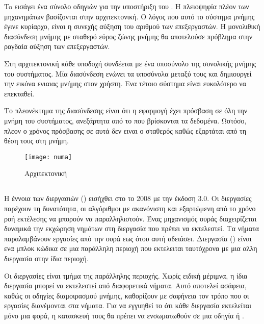 To \emph{} εισάγει ένα σύνολο οδηγιών για την υποστήριξη του \emph{}\cite{thread_affinity}. Η πλειοψηφία πλέον των μηχανημάτων βασίζονται στην \emph{} αρχιτεκτονική. Ο λόγος που αυτό το σύστημα μνήμης έγινε κυρίαρχο, είναι η συνεχής αύξηση του αριθμού των επεξεργαστών. Η μονολιθική διασύνδεση μνήμης με σταθερό εύρος ζώνης μνήμης θα αποτελούσε πρόβλημα στην ραγδαία αύξηση των επεξεργαστών.

Στη \emph{} αρχιτεκτονική κάθε υποδοχή συνδέεται με ένα υποσύνολο της συνολικής μνήμης του συστήματος. Μία διασύνδεση ενώνει τα υποσύνολα μεταξύ τους και δημιουργεί την εικόνα ενιαιας μνήμης στον χρήστη. Ενα τέτοιο σύστημα είναι ευκολότερο να επεκταθεί.

Το πλεονέκτημα της διασύνδεσης είναι ότι η εφαρμογή έχει πρόσβαση σε όλη την μνήμη του συστήματος, ανεξάρτητα από το που βρίσκονται τα δεδομένα. Ωστόσο, πλεον ο χρόνος πρόσβασης σε αυτά δεν ειναι ο σταθερός καθώς εξαρτάται από τη θέση τους στη μνήμη.


\begin{figure}[h]
\texttt{[image: numa]}
\centering
\captionsetup{justification=centering, singlelinecheck=false}
	\caption{Αρχιτεκτονική \cite{thenextstep152}}
\label{fig:numa}
\end{figure}



\subsection{}
\subparagraph{}
Η έννοια των διεργασιών (\emph{}) εισήχθει στο  το 2008 με την έκδοση 3.0\cite{parallel_dist}.
Οι διεργασίες παρέχουν τη δυνατότητα, οι αλγόριθμοι με ακανόνιστη και εξαρτώμενη από το χρόνο ροή εκτέλεσης να μπορούν να παραλληλιστούν. Ένας μηχανισμός ουράς διαχειρίζεται δυναμικά την εκχώρηση νημάτων στη διεργασία που πρέπει να εκτελεστεί. Τα νήματα παραλαμβάνουν εργασίες από την ουρά εως ότου αυτή αδειάσει.
Διεργασία (\emph{}) είναι ενα μπλοκ κώδικα σε μια παράλληλη περιοχή που εκτελειται ταυτόχρονα με μια αλλη διεργασία στην ίδια περιοχή. 

Οι διεργασίες είναι τμήμα της παράλληλης περιοχής.
Χωρίς ειδική μέριμνα, η ίδια διεργασία μπορεί να εκτελεστεί από διαφορετικά νήματα. Αυτό αποτελεί ασάφεια, καθώς οι οδηγίες διαμοιρασμού μνήμης, καθορίζουν με σαφήνεια τον τρόπο που οι εργασίες διανέμονται στα νήματα. Για να εγγυηθεί το  ότι κάθε διεργασία εκτελείται μόνο μια φορά, η κατασκευή τους θα πρέπει να ενσωματωθούν σε μια οδηγία \emph{} ή \emph{}.

